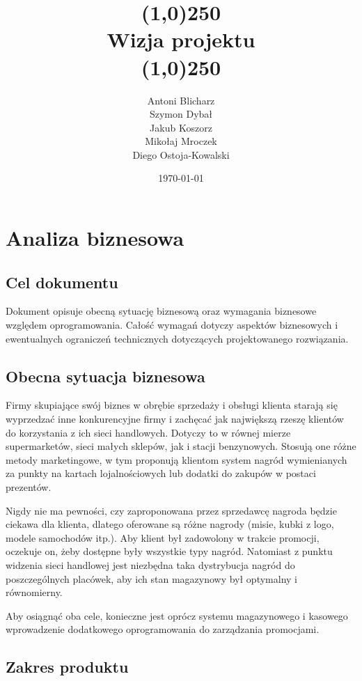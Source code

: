 \documentclass[a4paper,12pt]{article}
\title{\line(1,0){250}\\ Wizja projektu \\ \line(1,0){250}}
\author{Antoni Blicharz\\
        Szymon Dybał\\
        Jakub Koszorz\\
        Mikołaj Mroczek\\
        Diego Ostoja-Kowalski\\}
\date{\today}
\begin{document}
\begin{titlepage}
    \maketitle
\end{titlepage}
\newpage

\section{Analiza biznesowa}

\subsection*{Cel dokumentu}

Dokument opisuje obecną sytuację biznesową oraz wymagania biznesowe względem oprogramowania.
Całość wymagań dotyczy aspektów biznesowych i ewentualnych ograniczeń technicznych dotyczących projektowanego rozwiązania.

\subsection*{Obecna sytuacja biznesowa}

Firmy skupiające swój biznes w obrębie sprzedaży i obsługi klienta starają się wyprzedzać inne konkurencyjne firmy i zachęcać jak największą rzeszę klientów do korzystania z ich sieci handlowych.
Dotyczy to w równej mierze supermarketów, sieci małych sklepów, jak i stacji benzynowych.
Stosują one różne metody marketingowe, w tym proponują klientom system nagród wymienianych za punkty na kartach lojalnościowych lub dodatki do zakupów w postaci prezentów.

Nigdy nie ma pewności, czy zaproponowana przez sprzedawcę nagroda będzie ciekawa dla klienta, dlatego oferowane są różne nagrody (misie, kubki z logo, modele samochodów itp.). Aby klient był zadowolony w trakcie promocji, oczekuje on, żeby dostępne były wszystkie typy nagród.
Natomiast z punktu widzenia sieci handlowej jest niezbędna taka dystrybucja nagród do poszczególnych placówek, aby ich stan magazynowy był optymalny i równomierny.

Aby osiągnąć oba cele, konieczne jest oprócz systemu magazynowego i kasowego wprowadzenie dodatkowego oprogramowania do zarządzania promocjami.

\subsection*{Zakres produktu}
\end{document}
